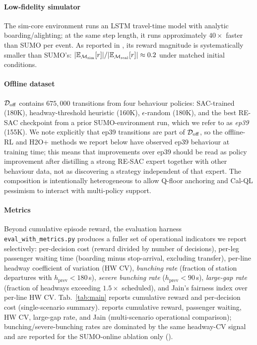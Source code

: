 \paragraph{Low-fidelity simulator}
The sim-core environment runs an LSTM travel-time model with analytic boarding/alighting; at the same step length, it runs approximately $40\times$ faster than SUMO per event.
As reported in , its reward magnitude is systematically smaller than SUMO's: $\lvert\mathbb{E}_{\mathcal{M}_{\mathrm{sim}}}[r]\rvert / \lvert\mathbb{E}_{\mathcal{M}_{\mathrm{real}}}[r]\rvert \approx 0.2$ under matched initial conditions.

\paragraph{Offline dataset}
$\mathcal{D}_{\mathrm{off}}$ contains $675{,}000$ transitions from four behaviour policies:
SAC-trained (180K), headway-threshold heuristic (160K), $\epsilon$-random (180K), and the best RE-SAC checkpoint from a prior SUMO-environment run, which we refer to as \emph{ep39} (155K).
We note explicitly that ep39 transitions are part of $\mathcal{D}_{\mathrm{off}}$, so the offline-RL and H2O+ methods we report below have observed ep39 behaviour at training time; this means that improvements over ep39 should be read as policy improvement after distilling a strong RE-SAC expert together with other behaviour data, not as discovering a strategy independent of that expert.
The composition is intentionally heterogeneous to allow Q-floor anchoring and Cal-QL pessimism to interact with multi-policy support.

\paragraph{Metrics}
Beyond cumulative episode reward, the evaluation harness \texttt{eval\_\allowbreak with\_\allowbreak metrics.py} produces a fuller set of operational indicators we report selectively:
per-decision cost (reward divided by number of decisions),
per-leg passenger waiting time (boarding minus stop-arrival, excluding transfer),
per-line headway coefficient of variation (HW CV),
\emph{bunching rate} (fraction of station departures with $h_{\text{prev}} < 180$\,s),
\emph{severe bunching rate} ($h_{\text{prev}} < 90$\,s),
\emph{large-gap rate} (fraction of headways exceeding $1.5\times$ scheduled),
and Jain's fairness index over per-line HW CV.
Tab.~\ref{tab:main} reports cumulative reward and per-decision cost (single-scenario summary).
 reports cumulative reward, passenger waiting, HW CV, large-gap rate, and Jain (multi-scenario operational comparison); bunching/severe-bunching rates are dominated by the same headway-CV signal and are reported for the SUMO-online ablation only ().

